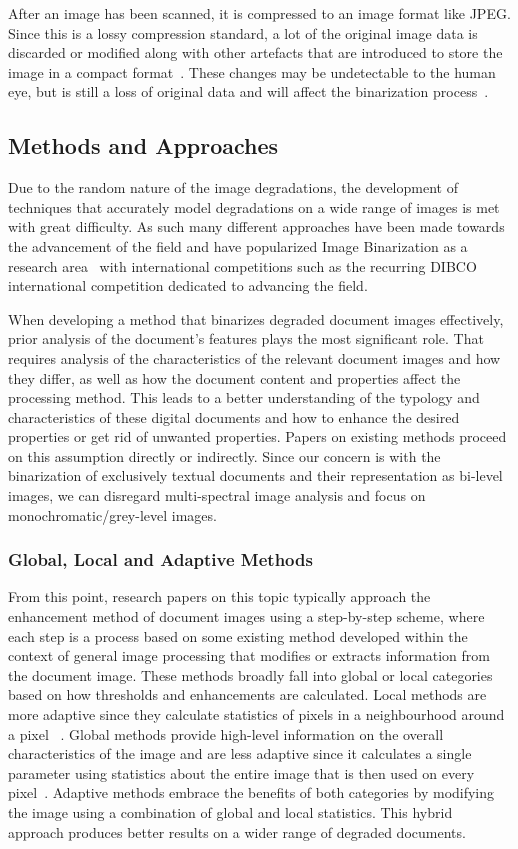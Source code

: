 \documentclass[a4paper, 12pt]{report}
\begin{document}
After an image has been scanned, it is compressed to an image format like JPEG.
Since this is a lossy compression standard, a lot of the original image data is
discarded or modified along with other artefacts that are introduced to store
the image in a compact format~\cite{eskenazi2016stability}. These changes may
be undetectable to the human eye, but is still a loss of original data and will
affect the binarization process~\cite{Baird2007}.

\subsection{Methods and Approaches}
Due to the random nature of the image degradations, the development of
techniques that accurately model degradations on a wide range of images is met
with great difficulty. As such many different approaches have been made towards
the advancement of the field and have popularized Image Binarization as a
research area~\cite{ait2022innovative} with international competitions such as
the recurring DIBCO international competition dedicated to advancing the field. \par

When developing a method that binarizes degraded document images effectively,
prior analysis of the document's features plays the most significant role. That
requires analysis of the characteristics of the relevant document images and
how they differ, as well as how the document content and properties affect the
processing method. This leads to a better understanding of the typology and
characteristics of these digital documents and how to enhance the desired
properties or get rid of unwanted properties. Papers on existing methods
proceed on this assumption directly or indirectly. Since our concern is with
the binarization of exclusively textual documents and their representation as
bi-level images, we can disregard multi-spectral image analysis and focus on
monochromatic/grey-level images.

\subsubsection{Global, Local and Adaptive Methods}
From this point, research papers on this topic typically approach the
enhancement method of document images using a step-by-step scheme, where each
step is a process based on some existing method developed within the context of
general image processing that modifies or extracts information from the
document image. These methods broadly fall into global or local categories
based on how thresholds and enhancements are calculated. Local methods are more
adaptive since they calculate statistics of pixels in a neighbourhood around a
pixel ~\cite{gatos2006adaptive}. Global methods provide high-level information
on the overall characteristics of the image and are less adaptive since it
calculates a single parameter using statistics about the entire image that is
then used on every pixel~\cite{gatos2006adaptive}. Adaptive methods embrace the
benefits of both categories by modifying the image using a combination of
global and local statistics. This hybrid approach produces better results on a
wider range of degraded documents.
\end{document}
